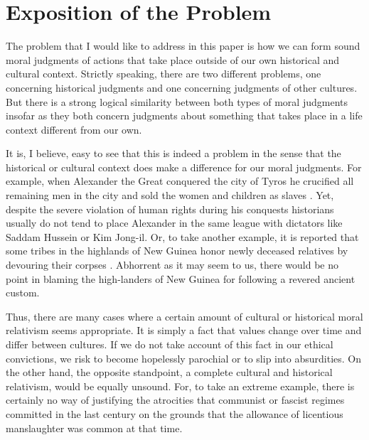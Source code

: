 \documentclass[12pt,a4paper,ngerman]{article}
\begin{document}
\fontsize{12}{18}
\selectfont

\newpage

\tableofcontents

\newpage

\setcounter{page}{1}

\section{Exposition of the Problem}

The problem that I would like to address in this paper is how we can
form sound moral judgments of actions that take place outside of our
own historical and cultural context. Strictly speaking, there are two
different problems, one concerning historical judgments and one
concerning judgments of other cultures. But there is a strong logical
similarity between both types of moral judgments insofar as they both
concern judgments about something that takes place in a life context
different from our own.

It is, I believe, easy to see that this is indeed a problem in the sense that
the historical or cultural context does make a difference for our moral
judgments. For example, when Alexander the Great conquered the city of Tyros
he crucified all remaining men in the city and sold the women and children as
slaves \cite[p. 239]{fox:1973}. Yet, despite the severe violation of human
rights during his conquests historians usually do not tend to place Alexander
in the same league with dictators like Saddam Hussein or Kim Jong-il.  Or, to
take another example, it is reported that some tribes in the highlands of New
Guinea honor newly deceased relatives by devouring their corpses \cite[p.
151]{diamond:2005}. Abhorrent as it may seem to us, there would be no point in
blaming the high-landers of New Guinea for following a revered ancient custom.
 
Thus, there are many cases where a certain amount of cultural or historical
moral relativism seems appropriate. It is simply a fact that values change
over time and differ between cultures. If we do not take account of this fact
in our ethical convictions, we risk to become hopelessly parochial or to slip
into absurdities. On the other hand, the opposite standpoint, a complete
cultural and historical relativism, would be equally unsound. For, to take an
extreme example, there is certainly no way of justifying the atrocities that
communist or fascist regimes committed in the last century on the grounds that
the allowance of licentious manslaughter was common at that time.
\end{document}
